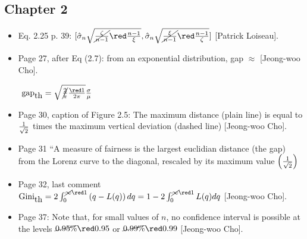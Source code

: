 \documentclass[11pt,twoside,onecolumn,a4paper]{article}
\newcommand{\cor}[2]{\cancel{#1} {\red #2}}
\begin{document}
 \subsection*{Chapter 2}
 \begin{itemize}
\item Eq. 2.25 p. 39: $[\hat{\sigma}_n\sqrt{\cor{\frac{\zeta}{n-1}}{\frac{n-1}{\xi}}},\hat{\sigma}_n \sqrt{\cor{\frac{\xi}{n-1}}{\frac{n-1}{\zeta}}}]$ [Patrick Loiseau].

\item Page 27, after Eq (2.7):
from an exponential distribution, gap $\approx$ [Jeong-woo Cho].

$\mbox{ gap}_{\mbox{th}}=\sqrt{\cor{2 \over \pi}{1 \over 2\pi}}\frac{\sigma}{\mu}$

\item Page 30, caption of Figure 2.5:
The maximum distance (plain line) is equal to  {\red$1\over \sqrt{2}$} times
  the maximum vertical deviation (dashed line) [Jeong-woo Cho].

\item Page 31 ``A measure of fairness is the largest euclidian
distance (the gap) from the Lorenz curve to the
diagonal, rescaled by its maximum value
{\red $\left(1\over \sqrt{2}\right)$}
\item Page 32, last comment
$\mbox{Gini}_{\mbox{th}} = 2\int_0^{\cor{\infty}{1}} \lp q - L(q)\rp dq
 =1- 2\int_0^{\cor{\infty}{1}} L(q) dq$ [Jeong-woo Cho].
 \item  Page 37: Note that, for small values of $n$, no confidence
interval is possible at the levels $\cor{0.95\%}{0.95}$ or $\cor{0.99\%}{0.99}$ [Jeong-woo Cho].
 \end{itemize}
\end{document}
